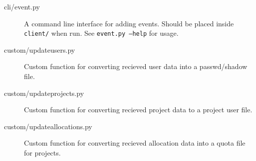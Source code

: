 \documentclass[titlepage, a4paper,10pt]{article}
\begin{document}
\begin{description}
    \item[cli/event.py] A command line interface for adding events. Should be
    placed inside \texttt{client/} when run. See \texttt{event.py --help} for
    usage.
    \item[custom/updateusers.py]    Custom function for converting recieved
    user data into a passwd/shadow file.
    \item[custom/updateprojects.py] Custom function for converting recieved
    project data to a project user file.
    \item[custom/updateallocations.py]  Custom function for converting recieved
    allocation data into a quota file for projects.
\end{description}
\end{document}
